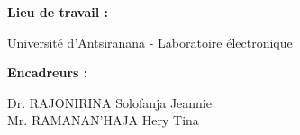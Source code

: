 \begin{titlepage}
\begin{normalsize}
\begin{itemize}
		\end{itemize}
	\end{normalsize}

	\begin{normalsize}
		\noindent\textbf{Lieu de travail :} 
		
 		\indent Université d'Antsiranana - Laboratoire électronique \\
	\end{normalsize}

	\begin{normalsize}
		\noindent\textbf{Encadreurs :}
		
		\indent Dr. RAJONIRINA Solofanja Jeannie \\
		\indent Mr. RAMANAN’HAJA Hery Tina
	
	\end{normalsize}

\end{titlepage}
